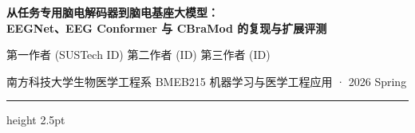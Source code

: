 \documentclass[12pt, a0paper]{article}
\begin{document}
\begin{center}
    {\fontsize{54}{64}\selectfont\bfseries\color{myblue}
        从任务专用脑电解码器到脑电基座大模型：\\[3mm]
        EEGNet、EEG Conformer 与 CBraMod 的复现与扩展评测\\[10mm]
    }

    {\fontsize{28}{34}\selectfont
        第一作者 (SUSTech ID) \hspace{2em} 第二作者 (ID) \hspace{2em} 第三作者 (ID)\\[4mm]
    }

    {\fontsize{20}{28}\selectfont\color{mygray}
        南方科技大学生物医学工程系 \hspace{3em}
        BMEB215 机器学习与医学工程应用 · 2026 Spring
    }

    \vspace{6mm}
    {\color{myblue}\hrule height 2.5pt}
    \vspace{6mm}
\end{center}
\end{document}
